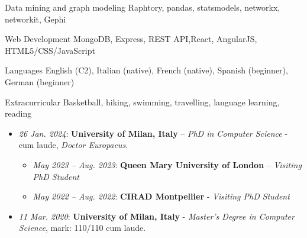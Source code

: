 \documentclass[11pt, a4paper]{awesome-cv}
\begin{document}
\begin{refsection}
\begin{cvskills}
  \cvskill
    {Data mining and graph modeling} %
    {Raphtory, pandas, statsmodels, networkx, networkit, Gephi} %

  \cvskill
    {Web Development} %
    {MongoDB, Express, REST API,React, AngularJS, HTML5/CSS/JavaScript} %


  \cvskill
    {Languages} %
    {English (C2), Italian (native), French (native), Spanish (beginner), German (beginner) } %
    
    \cvskill
    {Extracurricular} %
    {Basketball, hiking, swimming, travelling, language learning, reading}
\end{cvskills}


\begin{itemize}
\item \textit{26 Jan. 2024}: \textbf{University of Milan, Italy} – \textit{PhD in Computer Science} - cum laude, \textit{Doctor Europaeus}.



\begin{itemize}
    \item \textit{May 2023 – Aug. 2023}: \textbf{Queen Mary University of London} – \textit{Visiting PhD Student}

    \item \textit{May 2022 – Aug. 2022}: \textbf{CIRAD Montpellier} - \textit{Visiting PhD Student}
\end{itemize}

    \item \textit{11 Mar. 2020}: \textbf{University of Milan, Italy} - \textit{Master's Degree in Computer Science}, mark: 110/110 cum laude.
\end{itemize}








\end{refsection}
\end{document}
